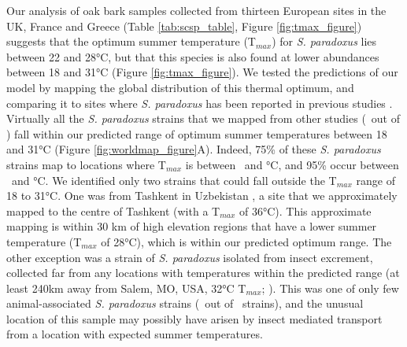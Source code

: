 \documentclass[12pt]{article}
\begin{document}
\begin{linenumbers}
Our analysis of oak bark samples collected from thirteen European sites in the UK, France and Greece (Table \ref{tab:scsp_table}, Figure \ref{fig:tmax_figure}) suggests that the optimum summer temperature (T$_{max}$) for \textit{S. paradoxus} lies between 22 and 28\si{\degreeCelsius}, but that this species is also found at lower abundances between 18 and 31\si{\degreeCelsius} (Figure \ref{fig:tmax_figure}). We tested the predictions of our model by mapping the global distribution of this thermal optimum, and comparing it to sites where \textit{S. paradoxus} has been reported in previous studies \citep{naumov_differentiation_1997,kuehne_allopatric_2007,liti_population_2009,zhang_saccharomyces_2010,leducq_local_2014}. Virtually all the \textit{S. paradoxus} strains that we mapped from other studies (\partmaxok\ out of \parinms) fall within our predicted range of optimum summer temperatures between 18 and 31\si{\degreeCelsius} (Figure \ref{fig:worldmap_figure}A). Indeed, 75\% of these \textit{S. paradoxus} strains map to locations where T$_{max}$ is between \parseventyfivel\ and \parseventyfiveu\si{\degreeCelsius}, and 95\% occur between \parninetyfivel\ and \parninetyfiveu\si{\degreeCelsius}. We identified only two strains that could fall outside the T$_{max}$ range of 18 to 31\si{\degreeCelsius}. One was from Tashkent in Uzbekistan \citep{naumov_differentiation_1997}, a site that we approximately mapped to the centre of Tashkent (with a T$_{max}$ of 36\si{\degreeCelsius}). This approximate mapping is within 30 km of high elevation regions that have a lower summer temperature (T$_{max}$ of 28\si{\degreeCelsius}), which is within our predicted optimum range. The other exception was a strain of \textit{S. paradoxus} isolated from insect excrement, collected far from any locations with temperatures within the predicted range (at least 240km away from Salem, MO, USA, 32\si{\degreeCelsius} T$_{max}$; \citealp{leducq_local_2014}). This was one of only few animal-associated \textit{S. paradoxus} strains (\paranimal\ out of \parinms\ strains), and the unusual location of this sample may possibly have arisen by insect mediated transport from a location with expected summer temperatures. 


\end{linenumbers}
\end{document}
